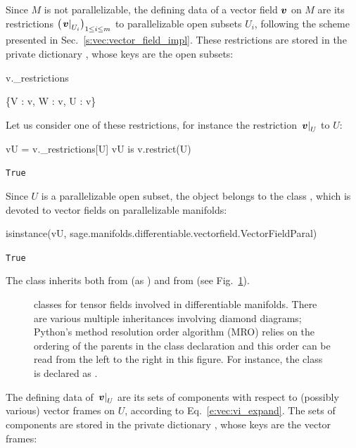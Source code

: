 Since $M$ is not parallelizable, the defining data of a
vector field $\bm{v}$ on $M$ are its restrictions
$\left(\left. \bm{v}\right| _{U_i}\right)_{1\leq i \leq m}$
to parallelizable open subsets $U_i$,
following the scheme presented in Sec.~\ref{s:vec:vector_field_impl}.
These restrictions are stored in the private dictionary , whose keys are
the open subsets:
\begin{NBin}
v._restrictions
\end{NBin}
\begin{NBoutM}
\left\{V : v, W : v, U : v\right\}
\end{NBoutM}
Let us consider one of these restrictions, for instance the restriction
$\left. \bm{v}\right| _U$ to $U$:
\begin{NBin}
vU = v._restrictions[U]
vU is v.restrict(U)
\end{NBin}
\begin{NBout}
\texttt{True}
\end{NBout}
Since $U$ is a parallelizable open subset, the object  belongs
to the class , which is devoted to vector fields
on parallelizable manifolds:
\begin{NBin}
isinstance(vU, sage.manifolds.differentiable.vectorfield.VectorFieldParal)
\end{NBin}
\begin{NBout}
\texttt{True}
\end{NBout}
The class  inherits both from
 (as ) and from
 (see Fig.~\ref{f:vec:tensorfield_classes}).
\begin{figure}
\begin{center}

\end{center}
\caption{\label{f:vec:tensorfield_classes}\footnotesize
\Sage{} classes for tensor fields involved in differentiable manifolds.
There are various multiple inheritances involving diamond diagrams;
Python's method resolution order algorithm (MRO) relies on the ordering of the parents
in the class declaration and this order can be read from the left to the right in
this figure. For instance, the class  is declared as
.}
\end{figure}
The defining data of $\left. \bm{v}\right| _U$ are
its sets of components with respect to (possibly various)
vector frames on $U$, according to Eq.~\eqref{e:vec:vi_expand}. The sets of components are stored in the private dictionary , whose keys are the vector frames:
